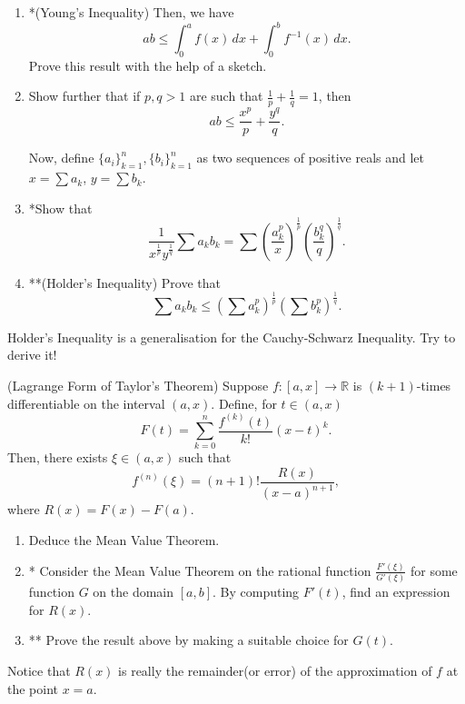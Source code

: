 \documentclass[../jarvis.tex]{subfiles}
\begin{document}
\begin{enumerate}
    \item *(Young's Inequality) Then, we have $$ab \leq \int_{0}^{a}f(x)\, dx+\int_{0}^{b}f^{-1}(x)\, dx.$$
    Prove this result with the help of a sketch.
    \item Show further that if $p, q > 1$ are such that $\frac{1}{p}+\frac{1}{q}=1$, then
    $$ab \leq \frac{x^p}{p}+\frac{y^q}{q}.$$
    
    Now, define $\{a_i\}_{k=1}^n,\{b_i\}_{k=1}^n$ as two sequences of positive reals and let $x=\sum a_k$, $y=\sum b_k$.
    \item *Show that $$\frac{1}{x^{\frac{1}{p}}y^{\frac{1}{q}}}\sum a_kb_k=\sum\left(\frac{a_k^p}{x}\right)^\frac{1}{p}\left(\frac{b_k^q}{q}\right)^\frac{1}{q}.$$
    \item **(Holder's Inequality) Prove that $$\sum a_kb_k\leq \left(\sum a_k^p\right)^\frac{1}{p}\left(\sum b_k^p\right)^\frac{1}{q}.$$
\end{enumerate} 
\begin{remark}
Holder's Inequality is a generalisation for the Cauchy-Schwarz Inequality. Try to derive it!
\end{remark}

\problem (Lagrange Form of Taylor's Theorem) Suppose $f:[a,x]\to\mathbb{R}$ is $(k+1)$-times differentiable on the interval $(a,x)$. Define, for $t\in (a,x)$
$$F(t)=\sum_{k=0}^{n}\frac{f^{(k)}(t)}{k!}(x-t)^k.$$
Then, there exists $\xi \in (a,x)$ such that
$$f^{(n)}(\xi)=(n+1)!\frac{R(x)}{(x-a)^{n+1}},$$
where $R(x)=F(x)-F(a)$.
\begin{enumerate}
    \item Deduce the Mean Value Theorem.
    \item * Consider the Mean Value Theorem on the rational function $\frac{F'(\xi)}{G'(\xi)}$ for some function $G$ on the domain $[a,b]$. By computing $F'(t)$, find an expression for $R(x)$.
    \item ** Prove the result above by making a suitable choice for $G(t)$.
\end{enumerate}
\begin{remark}
Notice that $R(x)$ is really the remainder(or error) of the approximation of $f$ at the point $x=a$.
\end{remark}
\end{document}
